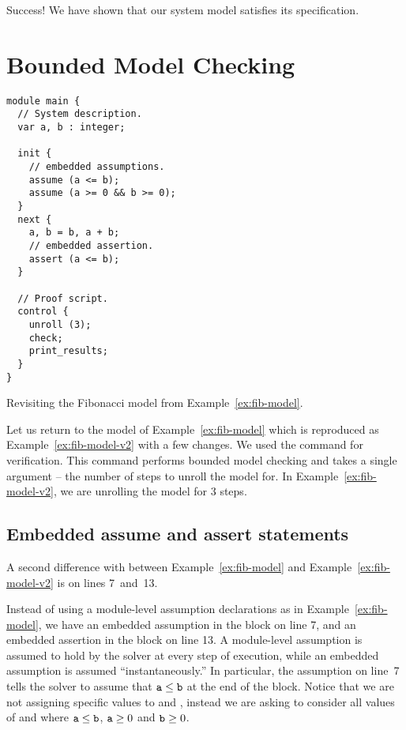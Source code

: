 Success! We have shown that our system model satisfies its specification.

\section{Bounded Model Checking}

\begin{uclidlisting}[htbp]
\begin{lstlisting}[language=uclid,style=uclidstyle]
module main {
  // System description.
  var a, b : integer;

  init {
    // embedded assumptions.
    assume (a <= b);
    assume (a >= 0 && b >= 0);
  }
  next {
    a, b = b, a + b;
    // embedded assertion.
    assert (a <= b);
  }

  // Proof script.
  control {
    unroll (3);
    check;
    print_results;
  }
}
\end{lstlisting}
\label{ex:fib-model-v2}
    \caption{Revisiting the Fibonacci model from Example~\ref{ex:fib-model}.}
\end{uclidlisting}

Let us return to the model of Example~\ref{ex:fib-model} which is reproduced as Example~\ref{ex:fib-model-v2} with a few changes. We used the  command for verification. This command performs bounded model checking and takes a single argument -- the number of steps to unroll the model for. In Example~\ref{ex:fib-model-v2}, we are unrolling the model for 3 steps. 

\subsection{Embedded assume and assert statements}

A second difference with between Example~\ref{ex:fib-model} and Example~\ref{ex:fib-model-v2} is on lines 7~and~13.

Instead of using a module-level assumption declarations as in Example~\ref{ex:fib-model}, we have an embedded assumption in the  block on line 7, and an embedded assertion in the  block on line 13. A module-level assumption is assumed to hold by the solver at every step of execution, while an embedded assumption is assumed ``instantaneously.'' In particular, the assumption on line~7 tells the solver to assume that $\texttt{a} \leq \texttt{b}$ at the end of the  block. Notice that we are not assigning specific values to  and , instead we are asking \uclid{} to consider all values of  and  where $\texttt{a} \leq \texttt{b}$, $\texttt{a} \geq 0$ and $\texttt{b} \geq 0$.

